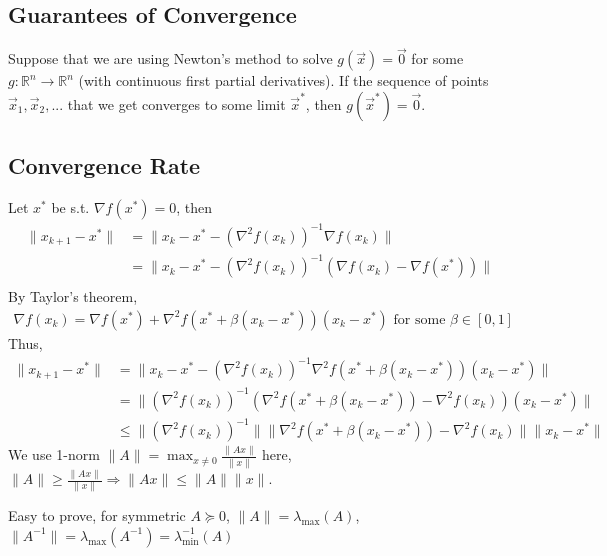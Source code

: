 \documentclass[11pt]{elegantbook}
\begin{document}
\subsection{Guarantees of Convergence}
\begin{theorem}
    Suppose that we are using Newton's method to solve $g(\vec{x}) = \vec{0}$ for some $g : \mathbb{R}^n \rightarrow  \mathbb{R}^n$ (with continuous first partial derivatives). If the sequence of points $\vec{x}_1,\vec{x}_2,...$ that we get converges to some limit $\vec{x}^*$, then $g(\vec{x}^*) = \vec{0}$.
\end{theorem}
\subsection{Convergence Rate}
Let $x^*$ be s.t. $\nabla f(x^*)=0$, then
\begin{equation}
    \begin{aligned}
        \|x_{k+1}-x^*\|&=\|x_k-x^*-(\nabla^2 f(x_k))^{-1}\nabla f(x_k)\|\\
        &=\|x_k-x^*-(\nabla^2 f(x_k))^{-1}(\nabla f(x_k)-\nabla f(x^*))\|\\
    \end{aligned}
    \nonumber
\end{equation}
By Taylor's theorem,
\begin{equation}
    \begin{aligned}
        \nabla f(x_k)=\nabla f(x^*)+\nabla^2 f(x^*+\beta(x_k-x^*))(x_k-x^*)\text{ for some }\beta\in[0,1]
    \end{aligned}
    \nonumber
\end{equation}
Thus,
\begin{equation}
    \begin{aligned}
        \|x_{k+1}-x^*\|
        &=\|x_k-x^*-(\nabla^2 f(x_k))^{-1}\nabla^2 f(x^*+\beta(x_k-x^*))(x_k-x^*)\|\\
        &=\|(\nabla^2 f(x_k))^{-1}(\nabla^2 f(x^*+\beta(x_k-x^*))-\nabla^2 f(x_k))(x_k-x^*)\|\\
        &\leq \|(\nabla^2 f(x_k))^{-1}\|\|\nabla^2 f(x^*+\beta(x_k-x^*))-\nabla^2 f(x_k)\|\|x_k-x^*\|
    \end{aligned}
    \nonumber
\end{equation}
We use 1-norm $\|A\|=\max_{x\neq 0}\frac{\|Ax\|}{\|x\|}$ here, $\|A\|\geq \frac{\|Ax\|}{\|x\|} \Rightarrow	\|Ax\|\leq \|A\|\|x\|$.

Easy to prove, for symmetric $A\succeq 0$, $\|A\|=\lambda_{\max}(A)$, $\|A^{-1}\|=\lambda_{\max}(A^{-1})=\lambda^{-1}_{\min}(A)$
\end{document}
